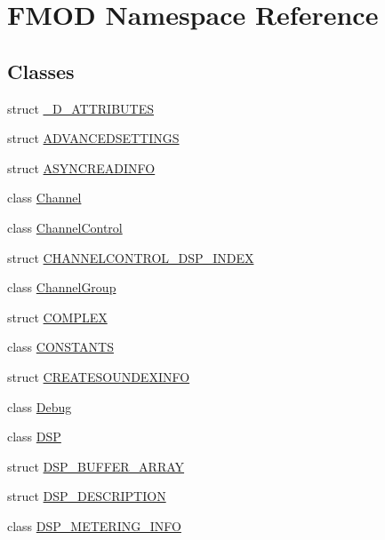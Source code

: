 \hypertarget{namespace_f_m_o_d}{}\section{F\+M\+OD Namespace Reference}
\label{namespace_f_m_o_d}
\subsection*{Classes}
\begin{DoxyCompactItemize}
\item 
struct \hyperlink{struct_f_m_o_d_1_1__3_d___a_t_t_r_i_b_u_t_e_s}{\+\_\+D\+\_\+\+A\+T\+T\+R\+I\+B\+U\+T\+ES}
\item 
struct \hyperlink{struct_f_m_o_d_1_1_a_d_v_a_n_c_e_d_s_e_t_t_i_n_g_s}{A\+D\+V\+A\+N\+C\+E\+D\+S\+E\+T\+T\+I\+N\+GS}
\item 
struct \hyperlink{struct_f_m_o_d_1_1_a_s_y_n_c_r_e_a_d_i_n_f_o}{A\+S\+Y\+N\+C\+R\+E\+A\+D\+I\+N\+FO}
\item 
class \hyperlink{class_f_m_o_d_1_1_channel}{Channel}
\item 
class \hyperlink{class_f_m_o_d_1_1_channel_control}{Channel\+Control}
\item 
struct \hyperlink{struct_f_m_o_d_1_1_c_h_a_n_n_e_l_c_o_n_t_r_o_l___d_s_p___i_n_d_e_x}{C\+H\+A\+N\+N\+E\+L\+C\+O\+N\+T\+R\+O\+L\+\_\+\+D\+S\+P\+\_\+\+I\+N\+D\+EX}
\item 
class \hyperlink{class_f_m_o_d_1_1_channel_group}{Channel\+Group}
\item 
struct \hyperlink{struct_f_m_o_d_1_1_c_o_m_p_l_e_x}{C\+O\+M\+P\+L\+EX}
\item 
class \hyperlink{class_f_m_o_d_1_1_c_o_n_s_t_a_n_t_s}{C\+O\+N\+S\+T\+A\+N\+TS}
\item 
struct \hyperlink{struct_f_m_o_d_1_1_c_r_e_a_t_e_s_o_u_n_d_e_x_i_n_f_o}{C\+R\+E\+A\+T\+E\+S\+O\+U\+N\+D\+E\+X\+I\+N\+FO}
\item 
class \hyperlink{class_f_m_o_d_1_1_debug}{Debug}
\item 
class \hyperlink{class_f_m_o_d_1_1_d_s_p}{D\+SP}
\item 
struct \hyperlink{struct_f_m_o_d_1_1_d_s_p___b_u_f_f_e_r___a_r_r_a_y}{D\+S\+P\+\_\+\+B\+U\+F\+F\+E\+R\+\_\+\+A\+R\+R\+AY}
\item 
struct \hyperlink{struct_f_m_o_d_1_1_d_s_p___d_e_s_c_r_i_p_t_i_o_n}{D\+S\+P\+\_\+\+D\+E\+S\+C\+R\+I\+P\+T\+I\+ON}
\item 
class \hyperlink{class_f_m_o_d_1_1_d_s_p___m_e_t_e_r_i_n_g___i_n_f_o}{D\+S\+P\+\_\+\+M\+E\+T\+E\+R\+I\+N\+G\+\_\+\+I\+N\+FO}

\end{DoxyCompactItemize}
